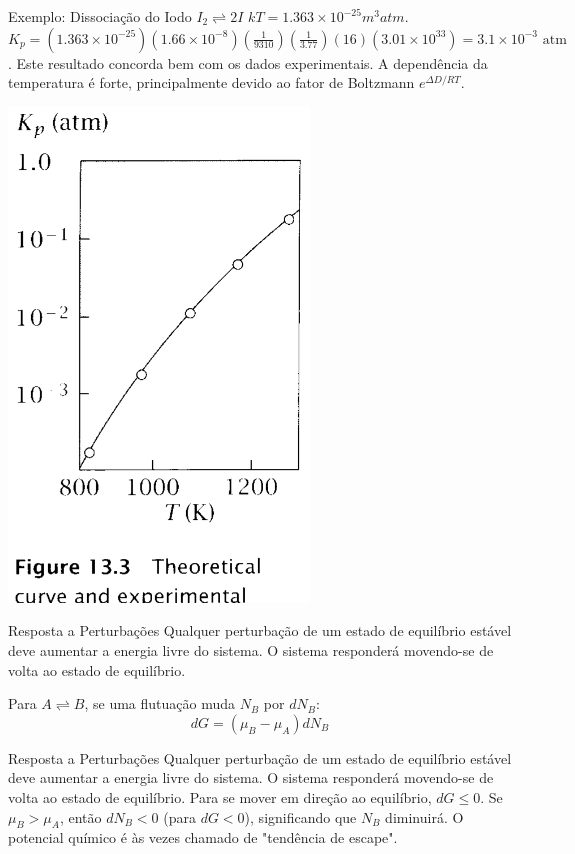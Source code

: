 \documentclass{beamer}
\begin{document}
\begin{frame}{Exemplo: Dissociação do Iodo $I_2 \rightleftharpoons 2I$}
    $kT = 1.363 \times 10^{-25} m^3 atm$.
    $K_p = (1.363 \times 10^{-25})(1.66 \times 10^{-8}) \left(\frac{1}{9310}\right) \left(\frac{1}{3.77}\right) (16) (3.01 \times 10^{33}) = 3.1 \times 10^{-3} \text{ atm}$.
    Este resultado concorda bem com os dados experimentais. A dependência da temperatura é forte, principalmente devido ao fator de Boltzmann $e^{\Delta D/RT}$.
\end{frame}
\begin{frame}
    \includegraphics[width=0.6\textwidth]{figs/iodo.png}
\end{frame}
\begin{frame}{Resposta a Perturbações}
        Qualquer perturbação de um estado de equilíbrio estável deve aumentar a energia livre do sistema. O sistema responderá movendo-se de volta ao estado de equilíbrio.
        
        Para $A \rightleftharpoons B$, se uma flutuação muda $N_B$ por $dN_B$:
        $$ dG = (\mu_B - \mu_A)dN_B $$
        
        
\end{frame}
\begin{frame}{Resposta a Perturbações}
        Qualquer perturbação de um estado de equilíbrio estável deve aumentar a energia livre do sistema. O sistema responderá movendo-se de volta ao estado de equilíbrio.
        Para se mover em direção ao equilíbrio, $dG \le 0$.
        Se $\mu_B > \mu_A$, então $dN_B < 0$ (para $dG < 0$), significando que $N_B$ diminuirá.
        O potencial químico é às vezes chamado de "tendência de escape".
        
\end{frame}
\end{document}
